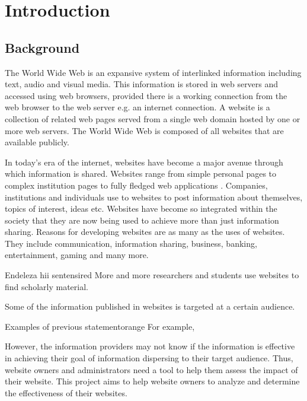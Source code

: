 \chapter{Introduction}
\section{Background}

\noindent
The World Wide Web is an expansive system of interlinked information including text, audio and visual media. This information is stored in web servers and accessed using web browsers, provided there is a working connection from the web browser to the web server e.g. an internet connection. A website is a collection of related web pages served from a single web domain hosted by one or more web servers. The World Wide Web is composed of all websites that are available publicly.

\noindent
In today's era of the internet, websites have become a major avenue through which information is shared. Websites range from simple personal pages to complex institution pages to fully fledged web applications . Companies, institutions and individuals use to websites to post information about themselves, topics of interest, ideas etc. Websites have become so integrated within the society that they are now being used to achieve more than just information sharing. Reasons for developing websites are as many as the uses of websites. They include communication, information sharing, business, banking, entertainment, gaming and many more.


\begin{review_comment}{Endeleza hii sentensi}{red}
{More and more researchers and students use websites to find scholarly material.
}\end{review_comment}

\noindent
Some of the information published in websites is targeted at a certain audience. \begin{review_comment}{Examples of previous statement}{orange}
{For example,}\end{review_comment}

\noindent
However, the information providers may not know if the information is effective in achieving their goal of information dispersing to their target audience. Thus, website owners and administrators need a tool to help them assess the impact of their website. This project aims to help website owners to analyze and determine the effectiveness of their websites.


